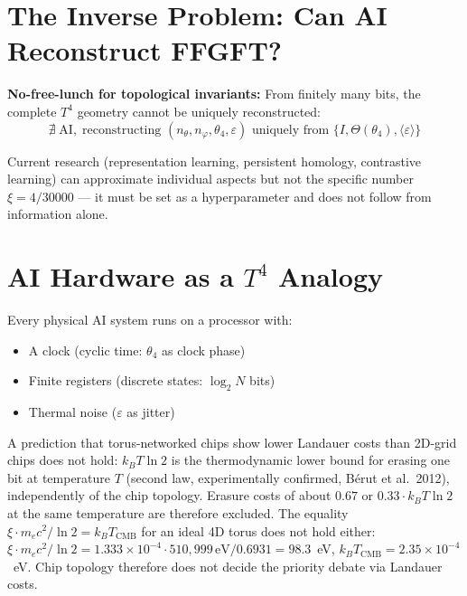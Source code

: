\section{The Inverse Problem: Can AI Reconstruct FFGFT?}

\textbf{No-free-lunch for topological invariants:} From finitely many bits,
the complete $T^4$ geometry cannot be uniquely reconstructed:
\begin{equation}
  \nexists\;\text{AI},\;\text{reconstructing }
  (n_\theta,n_\varphi,\theta_4,\varepsilon)
  \text{ uniquely from }
  \{I,\Theta(\theta_4),\langle\varepsilon\rangle\}
  \tag{243.14}
\end{equation}

Current research (representation learning, persistent homology, contrastive
learning) can approximate individual aspects but not the specific number
$\xi = 4/30000$ --- it must be set as a hyperparameter and does not follow
from information alone.

\section{AI Hardware as a $T^4$ Analogy}

Every physical AI system runs on a processor with:
\begin{itemize}
  \item A clock (cyclic time: $\theta_4$ as clock phase)
  \item Finite registers (discrete states: $\log_2 N$ bits)
  \item Thermal noise ($\varepsilon$ as jitter)
\end{itemize}

A prediction that torus-networked chips show lower Landauer costs than
2D-grid chips does not hold: $k_BT\ln2$ is the thermodynamic lower bound
for erasing one bit at temperature $T$ (second law, experimentally
confirmed, Bérut et al.\ 2012), independently of the chip topology.
Erasure costs of about $0.67$ or $0.33\cdot k_BT\ln2$ at the same
temperature are therefore excluded. The equality
$\xi\cdot m_ec^2/\ln2 = k_BT_\text{CMB}$ for an ideal 4D torus does not hold
either: $\xi\cdot m_ec^2/\ln2 = 1.333\times10^{-4}\cdot510{,}999\,\text{eV}/0.6931 = 98.3$~eV,
$k_BT_\text{CMB} = 2.35\times10^{-4}$~eV. Chip topology therefore does not
decide the priority debate via Landauer costs.

